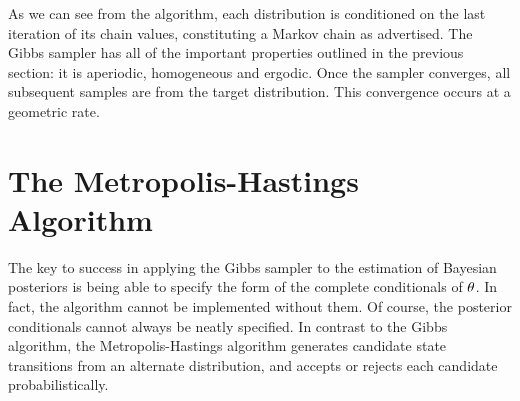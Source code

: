 As we can see from the algorithm, each distribution is conditioned on the last iteration of its chain values, constituting a Markov chain as advertised. The Gibbs sampler has all of the important properties outlined in the previous section: it is aperiodic, homogeneous and ergodic. Once the sampler converges, all subsequent samples are from the target distribution. This convergence occurs at a geometric rate.

% 
% 
% 
% 
% 
% 
% 
% 
% 
% 


\hypertarget{the-metropolis-hastings-algorithm}{}
\section*{The Metropolis-Hastings Algorithm}

The key to success in applying the Gibbs sampler to the estimation of Bayesian posteriors is being able to specify the form of the complete conditionals of ${\bf \theta}$. In fact, the algorithm cannot be implemented without them. Of course, the posterior conditionals cannot always be neatly specified. In contrast to the Gibbs algorithm, the Metropolis-Hastings algorithm generates candidate state transitions from an alternate distribution, and accepts or rejects each candidate probabilistically.

